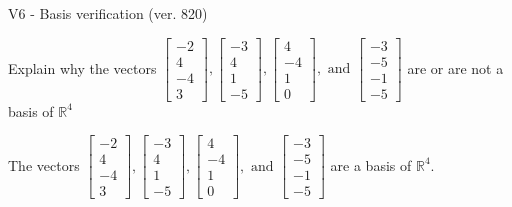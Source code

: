 \begin{exercise}
  \begin{exerciseTitle}V6 - Basis verification (ver. 820)\end{exerciseTitle}
  \begin{exerciseStatement}
    Explain why the vectors \(\left[\begin{array}{r}
-2 \\
4 \\
-4 \\
3
\end{array}\right] , \left[\begin{array}{r}
-3 \\
4 \\
1 \\
-5
\end{array}\right] , \left[\begin{array}{r}
4 \\
-4 \\
1 \\
0
\end{array}\right] , \text{ and } \left[\begin{array}{r}
-3 \\
-5 \\
-1 \\
-5
\end{array}\right]\) are or are not a basis of \(\mathbb{R}^4\)	


  \end{exerciseStatement}
  \begin{exerciseAnswer}
   The vectors \(\left[\begin{array}{r}
-2 \\
4 \\
-4 \\
3
\end{array}\right] , \left[\begin{array}{r}
-3 \\
4 \\
1 \\
-5
\end{array}\right] , \left[\begin{array}{r}
4 \\
-4 \\
1 \\
0
\end{array}\right] , \text{ and } \left[\begin{array}{r}
-3 \\
-5 \\
-1 \\
-5
\end{array}\right]\) 
  	 are  a basis of \(\mathbb{R}^4\).
  


  \end{exerciseAnswer}
\end{exercise}